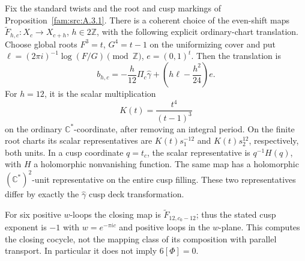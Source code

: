 \begin{proposition}\label{push:src:C.3.5}
Fix the standard twists and the root and cusp markings of Proposition~\ref{fam:src:A.3.1}.
There is a coherent choice of the even-shift maps
\(\widetilde F_{h,c}:X_c\to X_{c+h}\), \(h\in2\mathbb Z\),
with the following explicit ordinary-chart translation. Choose global
roots \(F^3=t\), \(G^4=t-1\) on the uniformizing cover and put
\(\ell=(2\pi i)^{-1}\log(F/G)\pmod{\mathbb Z}\), \(e=(0,1)^t\).
Then the translation is
\begin{equation}\label{mapsI:closing:eq:C-explicit-closing}
 b_{h,c}=-\frac h{12}\Pi_c\widehat\gamma
              +\left(h\ell-\frac{h^2}{24}\right)e.
\end{equation}
For \(h=12\), it is the scalar multiplication
\begin{equation}\label{mapsI:closing:eq:C-twelve-scalar}
 K(t)=\frac{t^4}{(t-1)^3}
\end{equation}
on the ordinary \(\mathbb C^*\)-coordinate, after removing an integral
period. On the finite root charts its scalar representatives are
\(K(t)s_1^{-12}\) and \(K(t)s_2^{12}\), respectively, both units.
In a cusp coordinate \(q=t_c\), the scalar representative is
\(q^{-1}H(q)\), with \(H\) a holomorphic nonvanishing function.
The same map has a holomorphic \((\mathbb C^*)^2\)-unit representative
on the entire cusp filling. These two representatives differ by
exactly the \(\widehat\gamma\) cusp deck transformation.

For six positive \(w\)-loops the closing map is
\(\widetilde F_{12,c_0-12}\); thus the stated cusp exponent is \(-1\)
with $w=e^{-\pi i c}$ and positive loops in the $w$-plane. This computes the closing
cocycle, not the mapping class of its composition with parallel
transport. In particular it does not imply \(6[\Phi]=0\).
\end{proposition}
